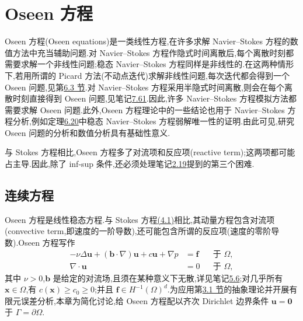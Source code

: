 \chapter{Oseen 方程}\label{chap:oseen}

\begin{note}[动机]\label{note:oseen-motivation}
Oseen 方程(Oseen equations)是一类线性方程,在许多求解 Navier--Stokes 方程的数值方法中充当辅助问题.对 Navier--Stokes 方程作隐式时间离散后,每个离散时刻都需要求解一个非线性问题;稳态 Navier--Stokes 方程同样是非线性的.在这两种情形下,若用所谓的 Picard 方法(不动点迭代)求解非线性问题,每次迭代都会得到一个 Oseen 问题,见第\hyperref[sec:steady-ns-picard]{6.3 节}.对 Navier--Stokes 方程采用半隐式时间离散,则会在每个离散时刻直接得到 Oseen 问题,见笔记\hyperref[note:oseen-semi-implicit]{7.61}.因此,许多 Navier--Stokes 方程模拟方法都需要求解 Oseen 问题.此外,Oseen 方程理论中的一些结论也用于 Navier--Stokes 方程分析,例如定理\hyperref[thm:steady-ns-uniqueness]{6.20}中稳态 Navier--Stokes 方程弱解唯一性的证明.由此可见,研究 Oseen 问题的分析和数值分析具有基础性意义.

与 Stokes 方程相比,Oseen 方程多了对流项和反应项(reactive term);这两项都可能占主导.因此,除了 inf-sup 条件,还必须处理笔记\hyperref[note:dimensionless-difficulties]{2.19}提到的第三个困难.
\end{note}

\section{连续方程}\label{sec:oseen-continuous-equations}

\begin{note}[Oseen 方程]\label{note:oseen-equations}
Oseen 方程是线性稳态方程.与 Stokes 方程\hyperref[eq:stokes-strong]{(4.1)}相比,其动量方程包含对流项(convective term,即速度的一阶导数),还可能包含所谓的反应项(速度的零阶导数).Oseen 方程写作
\begin{equation}\label{eq:oseen-strong}
\begin{aligned}
  -\nu\Delta\bm{u}+(\bm{b}\cdot\nabla)\bm{u}
     +c\bm{u}+\nabla p&=\bm{f} &&\text{于 }\Omega,\\
  \nabla\cdot\bm{u}&=0 &&\text{于 }\Omega,
\end{aligned}
\end{equation}
其中 $\nu>0$,$\bm{b}$ 是给定的对流场,且须在某种意义下无散,详见笔记\hyperref[note:oseen-skew-symmetry]{5.6};对几乎所有 $\bm{x}\in\Omega$,有 $c(\bm{x})\ge c_0\ge0$;并且 $\bm{f}\in H^{-1}(\Omega)^d$.为应用第\hyperref[sec:abstract-saddle-point]{3.1 节}的抽象理论并开展有限元误差分析,本章为简化讨论,给 Oseen 方程配以齐次 Dirichlet 边界条件 $\bm{u}=\bm{0}$ 于 $\Gamma=\partial\Omega$.
\end{note}

